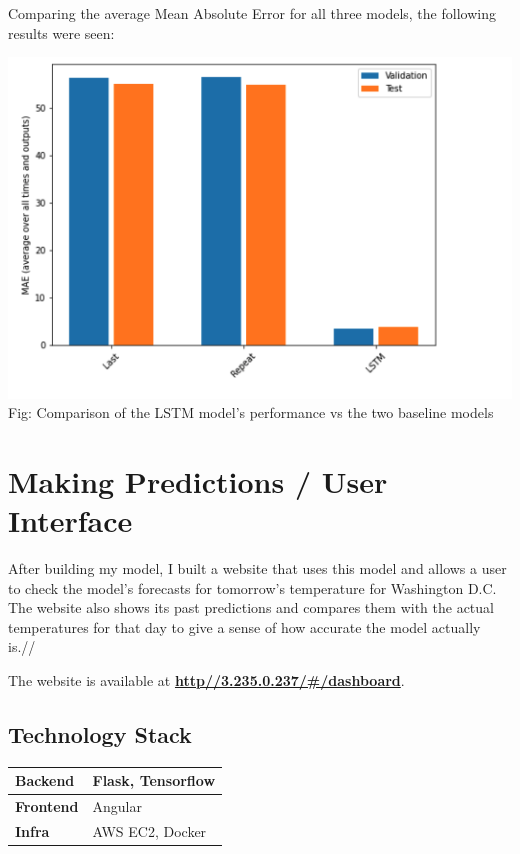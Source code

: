 \documentclass[paper=a4, fontsize=11pt, margin=1in]{scrartcl}
\numberwithin{equation}{section}		%
\numberwithin{figure}{section}			%
\numberwithin{table}{section}				%
\begin{document}
Comparing the average Mean Absolute Error for all three models, the following results were seen:\\
\begin{center}
    \includegraphics[width=\textwidth,height=0.3\textheight]{comparision.png}\\
    Fig: Comparison of the LSTM model's performance vs the two baseline models
\end{center}

\section{\textbf{Making Predictions / User Interface}}

After building my model, I built a website that uses this model and allows a user to check the model's forecasts for tomorrow's temperature for Washington D.C. The website also shows its past predictions and compares them with the actual temperatures for that day to give a sense of how accurate the model actually is.//

The website is available at \href{http://3.235.0.237/#/dashboard}{\textbf{http\://3.235.0.237/\#/dashboard}}.


\subsection{\textbf{Technology Stack}}


\begin{longtable}{|p{4.5cm}|p{7cm}|} 
\hline
\textbf{Backend} & Flask, Tensorflow \\ 
\hline
\textbf{Frontend} & Angular \\
\hline
\textbf{Infra} & AWS EC2, Docker \\
\hline
\end{longtable}
\end{document}
